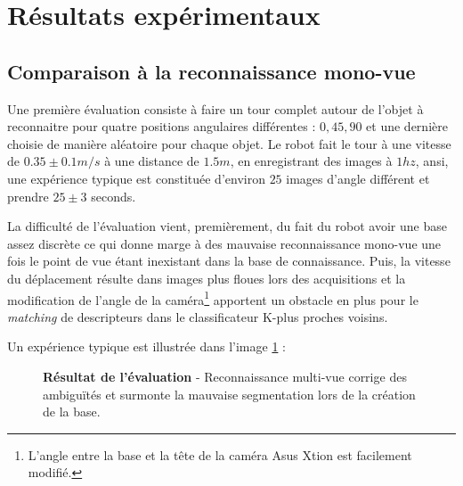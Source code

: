 \section{Résultats expérimentaux}
\subsection{Comparaison à la reconnaissance mono-vue}
Une première évaluation consiste à faire un tour complet autour de l'objet à reconnaitre pour quatre positions angulaires différentes : $0, 45, 90$ et une dernière choisie de manière aléatoire pour chaque objet. Le robot fait le tour à une vitesse de $0.35 \pm 0.1 m/s$ à une distance de $1.5m$, en enregistrant des images à $1hz$, ansi, une expérience typique est constituée d'environ $25$  images d'angle différent et prendre $25 \pm 3$ seconds. 

La difficulté de l'évaluation vient, premièrement, du fait du robot avoir une base assez discrète ce qui donne marge à des mauvaise reconnaissance mono-vue une fois le point de vue étant inexistant dans la base de connaissance. Puis, la vitesse du déplacement résulte dans images plus floues lors des acquisitions et la modification de l'angle de la caméra\footnote{L'angle entre la base et la tête de la caméra Asus Xtion est facilement modifié.} apportent un obstacle en plus pour le \textit{matching} de descripteurs dans le classificateur K-plus proches voisins.

Un expérience typique est illustrée dans l'image \ref{fig:resultats_expe} :

\begin{figure}[H]
			\caption{\textbf{Résultat de l'évaluation} - Reconnaissance multi-vue corrige des ambiguïtés et surmonte la mauvaise segmentation lors de la création de la base.}
	\label{fig:resultats_expe}
\end{figure}

